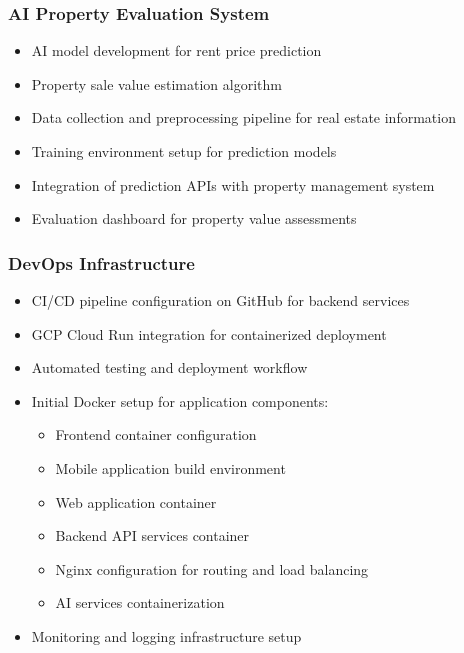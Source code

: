 \subsubsection{AI Property Evaluation System}
\begin{itemize}
    \item AI model development for rent price prediction
    \item Property sale value estimation algorithm
    \item Data collection and preprocessing pipeline for real estate information
    \item Training environment setup for prediction models
    \item Integration of prediction APIs with property management system
    \item Evaluation dashboard for property value assessments
\end{itemize}

\subsubsection{DevOps Infrastructure}
\begin{itemize}
    \item CI/CD pipeline configuration on GitHub for backend services
    \item GCP Cloud Run integration for containerized deployment
    \item Automated testing and deployment workflow
    \item Initial Docker setup for application components:
        \begin{itemize}
            \item Frontend container configuration
            \item Mobile application build environment
            \item Web application container
            \item Backend API services container
            \item Nginx configuration for routing and load balancing
            \item AI services containerization
        \end{itemize}
    \item Monitoring and logging infrastructure setup
\end{itemize}

